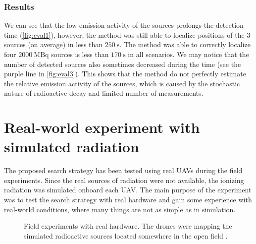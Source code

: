 \subsubsection{Results}
We can see that the low emission activity of the sources prolongs the detection time (\ref{fig:eval1}), however, the method was still able to localize positions of the $3$ sources (on average) in less than $\SI{250}{\second}$.
The method was able to correctly localize four $\SI{2000}{\mega\becquerel}$ sources is less than  $\SI{170}{\second}$ in all scenarios.
We may notice that the number of detected sources also sometimes decreased during the time (see the purple line in \ref{fig:eval3}). 
This shows that the method do not perfectly estimate the relative emission activity of the sources, which is caused by the stochastic nature of radioactive decay and limited number of measurements.





\section{Real-world experiment with simulated radiation\label{chap:exp3}}
The proposed search strategy has been tested using real \ac{UAV}s during the field experiments.
Since the real sources of radiation were not available, the ionizing radiation was simulated onboard each \ac{UAV}.
The main purpose of the experiment was to test the search strategy with real hardware and gain some experience with real-world conditions, where many things are not as simple as in simulation.
\begin{figure}[!htb]
  \centering
  \caption{Field experiments with real hardware. The drones \protect{} were mapping the simulated radioactive sources located somewhere in the open field \protect{}.}
  \label{fig:field}
\end{figure}
